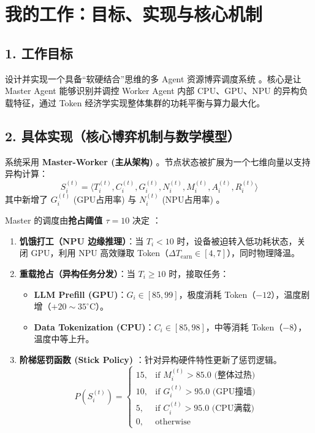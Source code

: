 \documentclass[11pt,a4paper]{ctexart}
\begin{document}
\section{我的工作：目标、实现与核心机制}

\subsection{1. 工作目标}
设计并实现一个具备“软硬结合”思维的多 Agent 资源博弈调度系统 。核心是让 Master Agent 能够识别并调控 Worker Agent 内部 CPU、GPU、NPU 的异构负载特征，通过 Token 经济学实现整体集群的功耗平衡与算力最大化。

\subsection{2. 具体实现（核心博弈机制与数学模型）}
系统采用 \textbf{Master-Worker (主从架构)} 。节点状态被扩展为一个七维向量以支持异构计算：
\begin{equation}
S_i^{(t)} = \langle T_i^{(t)}, C_i^{(t)}, G_i^{(t)}, N_i^{(t)}, M_i^{(t)}, A_i^{(t)}, R_i^{(t)} \rangle
\end{equation}
其中新增了 $G_i^{(t)}$ (GPU占用率) 与 $N_i^{(t)}$ (NPU占用率) 。

Master 的调度由\textbf{抢占阈值 $\tau = 10$} 决定 ：
\begin{enumerate}
    \item \textbf{饥饿打工（NPU 边缘推理）}：当 $T_i < 10$ 时，设备被迫转入低功耗状态，关闭 GPU，利用 NPU 高效赚取 Token（$\Delta T_{\text{earn}} \in [4, 7]$），同时物理降温。
    \item \textbf{重载抢占（异构任务分发）}：当 $T_i \ge 10$ 时，接取任务：
    \begin{itemize}
        \item \textbf{LLM Prefill (GPU)}：$G_i \in [85, 99]$，极度消耗 Token（$-12$），温度剧增（$+20\sim35^\circ\text{C}$）。
        \item \textbf{Data Tokenization (CPU)}：$C_i \in [85, 98]$，中等消耗 Token（$-8$），温度中等上升。
    \end{itemize}
    \item \textbf{阶梯惩罚函数 (Stick Policy)} ：针对异构硬件特性更新了惩罚逻辑。
    \begin{equation}
    P(S_i^{(t)}) = 
    \begin{cases} 
    15, & \text{if } M_i^{(t)} > 85.0 \text{ (整体过热)} \\
    10, & \text{if } G_i^{(t)} > 95.0 \text{ (GPU撞墙)} \\
    5,  & \text{if } C_i^{(t)} > 95.0 \text{ (CPU满载)} \\
    0, & \text{otherwise}
    \end{cases}
    \end{equation}
\end{enumerate}
\end{document}
